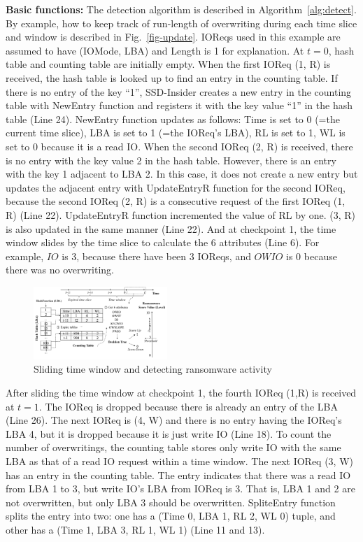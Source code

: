 \documentclass[conference]{IEEEtran}
\newcommand{\ours}{SSD-Insider}
\begin{document}
{\bf Basic functions:} 
The detection algorithm is described in Algorithm~\ref{alg:detect}.
By example, how to keep track of run-length of 
overwriting during each time slice and window is described in Fig.~\ref{fig-update}.  
IOReqs used in this example are assumed to have (IOMode, LBA) and Length is 1
for explanation. 
At $t=0$, hash table and counting table are initially empty.
When the first IOReq (1, R) is received, the hash table is looked up to find an entry 
in the counting table. If there is no entry of the key ``1'', \ours{} creates
a new entry in the counting table with NewEntry function and registers it with the 
key value ``1'' in the hash table (Line 24). NewEntry function updates as follows: Time is set to 0 
(=the current time slice), LBA is set to 1 (=the IOReq's LBA), RL is set to 1,
WL is set to 0 because it is a read IO. When the second IOReq (2, R) is received, 
there is no entry with the key value 2 in the hash table. However, there is 
an entry with the key 1 adjacent to LBA 2. In this case, it does not create 
a new entry but updates the adjacent entry with UpdateEntryR function for the second IOReq,
because the second IOReq (2, R) is a consecutive request of the first IOReq (1, R) (Line 22).
UpdateEntryR function incremented the value of RL by one. (3, R) is also updated 
in the same manner (Line 22). And at checkpoint 1, the time window slides by the time slice 
to calculate the 6 attributes (Line 6). 
For example, $IO$ is 3, because there have been 3 IOReqs, 
and $OWIO$ is 0 because there was no overwriting. 

\begin{figure}
	\includegraphics[width=0.45\textwidth]{fig/windowupdate.png}
	\caption{Sliding time window and detecting ransomware activity}\label{fig-sw}
\end{figure}
After sliding the time window at checkpoint 1, the fourth IOReq (1,R) is received at 
$t=1$. The IOReq is dropped because there is already an entry of the LBA (Line 26). 
The next IOReq is (4, W) and there is no entry having the IOReq's LBA 4, 
but it is dropped because it is just write IO (Line 18). 
To count the number of overwritings, the counting table stores only write IO with the same LBA 
as that of a read IO request within a time window. The next IOReq (3, W) has an entry 
in the counting table. The entry indicates that there was a read IO from LBA 1 to 3, 
but write IO's LBA from IOReq is 3. 
 That is, LBA 1 and 2 are not overwritten, but only LBA 3 should be overwritten.
SpliteEntry function splits the entry into two: one has a (Time 0, LBA 1, RL 2, WL 0) tuple,
and other has a (Time 1, LBA 3, RL 1, WL 1) (Line 11 and 13). 
\end{document}
